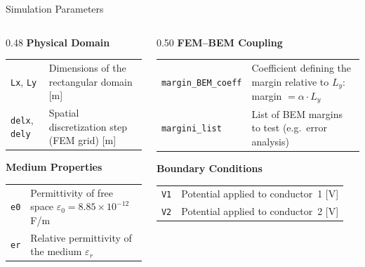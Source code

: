 \documentclass[aspectratio=169]{beamer}
\begin{document}
\begin{frame}{Simulation Parameters}

\begin{columns}[T]

\begin{column}{0.48\textwidth}
  \textbf{\color{blue!70!black}Physical Domain}
  \vspace{0.3em}
  \begin{tabular}{@{}lp{4.2cm}@{}}
    \toprule
    \texttt{Lx}, \texttt{Ly} & Dimensions of the rectangular domain [m] \\
    \texttt{delx}, \texttt{dely} & Spatial discretization step (FEM grid) [m] \\
    \bottomrule
  \end{tabular}

  \vspace{0.8em}
  \textbf{\color{blue!70!black}Medium Properties}
  \vspace{0.3em}
  \begin{tabular}{@{}lp{4.2cm}@{}}
    \toprule
    \texttt{e0} & Permittivity of free space $\varepsilon_0 = 8.85\times10^{-12}$ F/m \\
    \texttt{er} & Relative permittivity of the medium $\varepsilon_r$ \\
    \bottomrule
  \end{tabular}
\end{column}

\begin{column}{0.50\textwidth}
  \textbf{\color{blue!70!black}FEM--BEM Coupling}
  \vspace{0.3em}
  \begin{tabular}{@{}lp{4.2cm}@{}}
    \toprule
    \texttt{margin\_BEM\_coeff} & Coefficient defining the margin relative to $L_y$: margin $= \alpha \cdot L_y$ \\
    \texttt{margini\_list} & List of BEM margins to test (e.g.\ error analysis) \\
    \bottomrule
  \end{tabular}

  \vspace{0.8em}
  \textbf{\color{blue!70!black}Boundary Conditions}
  \vspace{0.3em}
  \begin{tabular}{@{}lp{4.2cm}@{}}
    \toprule
    \texttt{V1} & Potential applied to conductor~1 [V] \\
    \texttt{V2} & Potential applied to conductor~2 [V] \\
    \bottomrule
  \end{tabular}

\end{column}

\end{columns}

\end{frame}
\end{document}
